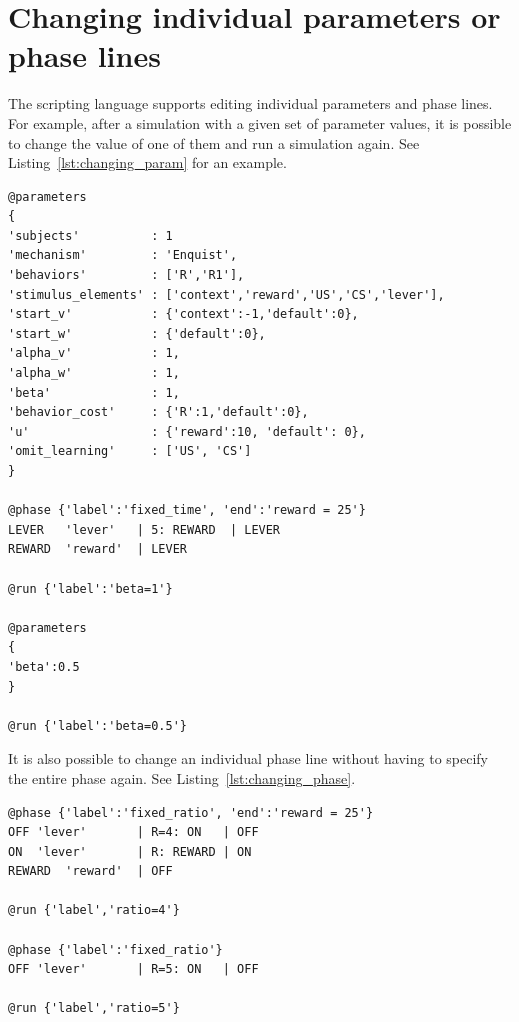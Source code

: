 \documentclass[11pt]{article}
\begin{document}
\section{Changing individual parameters or phase lines}
The scripting language supports editing individual parameters and phase lines. For example, after a simulation with a given set of parameter values, it is possible to change the value of one of them and run a simulation again. See Listing~\ref{lst:changing_param} for an example.
\begin{lstlisting}[caption={Changing an individual parameter}, label=lst:changing_param]
@parameters
{
'subjects'          : 1
'mechanism'         : 'Enquist',
'behaviors'         : ['R','R1'],
'stimulus_elements' : ['context','reward','US','CS','lever'],
'start_v'           : {'context':-1,'default':0}, 
'start_w'           : {'default':0},
'alpha_v'           : 1,
'alpha_w'           : 1,
'beta'              : 1,
'behavior_cost'     : {'R':1,'default':0},
'u'                 : {'reward':10, 'default': 0},
'omit_learning'     : ['US', 'CS']
}

@phase {'label':'fixed_time', 'end':'reward = 25'}
LEVER   'lever'   | 5: REWARD  | LEVER
REWARD  'reward'  | LEVER

@run {'label':'beta=1'}

@parameters 
{
'beta':0.5
}

@run {'label':'beta=0.5'}
\end{lstlisting}
It is also possible to change an individual phase line without having to specify the entire phase again. See Listing~\ref{lst:changing_phase}.


\begin{lstlisting}[caption={Changing an individual parameter}, label=lst:changing_phase]
@phase {'label':'fixed_ratio', 'end':'reward = 25'}
OFF 'lever'       | R=4: ON   | OFF
ON  'lever'       | R: REWARD | ON 
REWARD  'reward'  | OFF

@run {'label','ratio=4'}

@phase {'label':'fixed_ratio'}
OFF 'lever'       | R=5: ON   | OFF

@run {'label','ratio=5'}
\end{lstlisting}
\end{document}

